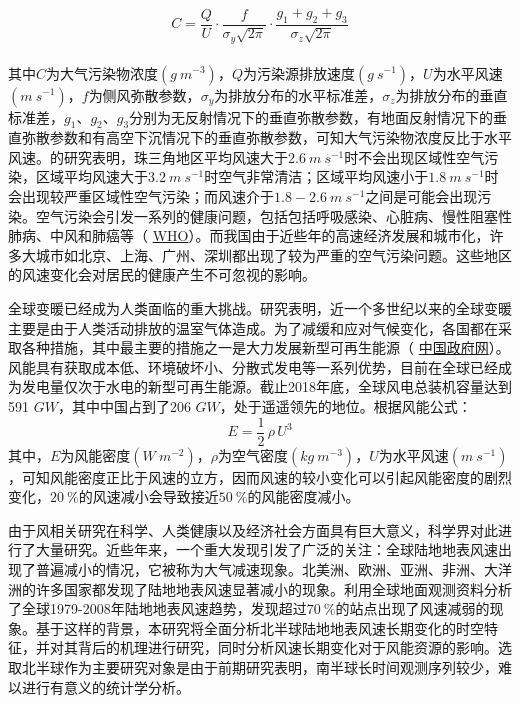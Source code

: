 \begin{equation} \label{eq:gaussian}
C = \frac{Q}{U} \cdot \frac{f}{\sigma_{y} \sqrt{2\pi}} \cdot \frac{g_{1} + g_{2} + g_{3}}{\sigma_{z} \sqrt{2\pi}}
\end{equation} ~\\
其中$C$为大气污染物浓度$(g ~ m^{-3})$，$Q$为污染源排放速度$(g ~ s^{-1})$，$U$为水平风速$(m ~ s^{-1})$，$f$为侧风弥散参数，$\sigma_{y}$为排放分布的水平标准差，$\sigma_{z}$为排放分布的垂直标准差，$g_{1}$、$g_{2}$、$g_{3}$分别为无反射情况下的垂直弥散参数，有地面反射情况下的垂直弥散参数和有高空下沉情况下的垂直弥散参数，可知大气污染物浓度反比于水平风速。\citet{张人文2011珠江三角洲风场对空气质量的影响}的研究表明，珠三角地区平均风速大于$2.6 ~ m ~ s^{-1}$时不会出现区域性空气污染，区域平均风速大于$3.2~ m ~ s^{-1}$时空气非常清洁；区域平均风速小于$1.8 ~ m ~ s^{-1}$时会出现较严重区域性空气污染；而风速介于$1.8 - 2.6 ~ m ~ s^{-1}$之间是可能会出现污染。空气污染会引发一系列的健康问题，包括包括呼吸感染、心脏病、慢性阻塞性肺病、中风和肺癌等（ \href{https://www.who.int/mediacentre/news/releases/2014/air-pollution/en/}{WHO}）。而我国由于近些年的高速经济发展和城市化，许多大城市如北京、上海、广州、深圳都出现了较为严重的空气污染问题\citep{chan2008air}。这些地区的风速变化会对居民的健康产生不可忽视的影响。

全球变暖已经成为人类面临的重大挑战。研究表明，近一个多世纪以来的全球变暖主要是由于人类活动排放的温室气体造成\citep{stocker2013climate}。为了减缓和应对气候变化，各国都在采取各种措施，其中最主要的措施之一是大力发展新型可再生能源（ \href{http://www.gov.cn/wszb/zhibo349/content_1426220.htm}{中国政府网}）。风能具有获取成本低、环境破坏小、分散式发电等一系列优势，目前在全球已经成为发电量仅次于水电的新型可再生能源\citep{carvalho2017potential}。截止2018年底，全球风电总装机容量达到591 $GW$，其中中国占到了206 $GW$，处于遥遥领先的地位\citep{ohlenforst2019global}。根据风能公式\citep{manwell2010wind}：
\begin{equation} \label{eq:windpower}
E = \frac{1}{2} \, \rho \, U^{3}
\end{equation} 
其中，$E$为风能密度$(W ~ m^{-2})$，$\rho$为空气密度$(kg ~ m^{-3})$，$U$为水平风速$(m ~ s^{-1})$，可知风能密度正比于风速的立方，因而风速的较小变化可以引起风能密度的剧烈变化，$20 ~ \%$的风速减小会导致接近$50 ~ \%$的风能密度减小。

由于风相关研究在科学、人类健康以及经济社会方面具有巨大意义，科学界对此进行了大量研究。近些年来，一个重大发现引发了广泛的关注：全球陆地地表风速出现了普遍减小的情况，它被称为大气减速现象\citep{roderick2007attribution}。北美洲、欧洲、亚洲、非洲、大洋洲的许多国家都发现了陆地地表风速显著减小的现象\citep{wan2010homogenization, pryor2010addendum, walter2006high,guo2011changes}。\citet{vautard2010northern}利用全球地面观测资料分析了全球1979-2008年陆地地表风速趋势，发现超过$70 ~\%$的站点出现了风速减弱的现象。基于这样的背景，本研究将全面分析北半球陆地地表风速长期变化的时空特征，并对其背后的机理进行研究，同时分析风速长期变化对于风能资源的影响。选取北半球作为主要研究对象是由于前期研究表明，南半球长时间观测序列较少，难以进行有意义的统计学分析。

